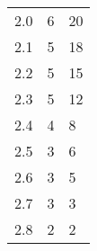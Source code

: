 \begin{table}[H]
{\begin{tabular}{|l|l|l|}
2.0                      & 6                                                                                                                   & 20                                                                                                                 \\
2.1                      & 5                                                                                                                   & 18                                                                                                                 \\
2.2                      & 5                                                                                                                   & 15                                                                                                                 \\
2.3                      & 5                                                                                                                   & 12                                                                                                                 \\
2.4                      & 4                                                                                                                   & 8                                                                                                                  \\
2.5                      & 3                                                                                                                   & 6                                                                                                                  \\
2.6                      & 3                                                                                                                   & 5                                                                                                                  \\
2.7                      & 3                                                                                                                   & 3                                                                                                                  \\
2.8                      & 2                                                                                                                   & 2                                                                                                                  \\

\end{tabular}}
\end{table}
